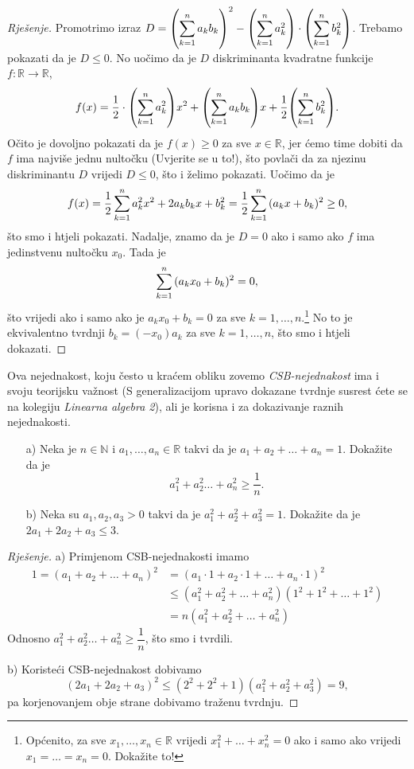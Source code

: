 \begin{proof}[Rješenje]
Promotrimo izraz $D=\left(\dsum_{k=1}^n{\,a_kb_k}\right)^2- \left(\dsum_{k=1}^n{\,a_k^2}\right)\cdot\left(\dsum_{k=1}^n{\,b_k^2}\right)$. Trebamo pokazati da je $D\leq 0$. No uočimo da je $D$ diskriminanta kvadratne funkcije $f : \mathbb{R}\to \mathbb{R}$,
$$f(x)=\dfrac{1}{2}\cdot\left(\dsum_{k=1}^n{\,a_k^2}\right)x^2+\left(\dsum_{k=1}^n{\,a_kb_k}\right)x+\dfrac{1}{2}\left(\dsum_{k=1}^n{\,b_k^2}\right).$$
Očito je dovoljno pokazati da je $f(x)\geq 0$ za sve $x\in \mathbb{R}$, jer ćemo time dobiti da $f$ ima najviše jednu nultočku (Uvjerite se u to!), što povlači da za njezinu diskriminantu $D$ vrijedi $D\leq 0$, što i želimo pokazati. Uočimo da je
$$f(x)=\dfrac{1}{2}\,\dsum_{k=1}^n{\,a_k^2x^2+2a_kb_kx+b_k^2}=\dfrac{1}{2}\,\dsum_{k=1}^n{\,(a_kx+b_k)^2}\geq 0,$$
što smo i htjeli pokazati. Nadalje, znamo da je $D=0$ ako i samo ako $f$ ima jedinstvenu nultočku $x_0$. Tada je $$\dsum_{k=1}^n{\,(a_kx_0+b_k)^2}=0,$$ što vrijedi ako i samo ako je $a_kx_0+b_k=0$ za sve $k=1, \dots, n$.\footnote{Općenito, za sve $x_1, \dots, x_n\in \mathbb{R}$ vrijedi $x_1^2+\dots+x_n^2=0$ ako i samo ako vrijedi $x_1=\dots=x_n=0$. Dokažite to!} No to je ekvivalentno tvrdnji $b_k=(-x_0)a_k$ za sve $k=1, \dots, n$, što smo i htjeli dokazati.
\end{proof}
Ova nejednakost, koju često u kraćem obliku zovemo \textit{CSB-nejednakost} ima i svoju teorijsku važnost (S generalizacijom upravo dokazane tvrdnje susrest ćete se na kolegiju \textit{Linearna algebra 2}), ali je korisna i za dokazivanje raznih nejednakosti.
\begin{exercise} \textbf{}
\begin{itemize}
\item[a)] Neka je $n\in \mathbb{N}$ i $a_1, \dots, a_n\in \mathbb{R}$ takvi da je $a_1+a_2+\dots+ a_n=1$. Dokažite da je $$a_1^2+a_2^2\dots+a_n^2\geq \dfrac{1}{n}.$$
\item[b)] Neka su $a_1, a_2, a_3>0$ takvi da je $a_1^2+a_2^2+a_3^2=1$. Dokažite da je $2a_1+2a_2+a_3\leq 3$.
\end{itemize}
\end{exercise}
\begin{proof}[Rješenje]
a) Primjenom CSB-nejednakosti imamo
\begin{align*}
1=(a_1+a_2+\dots+a_n)^2&=(a_1\cdot1+a_2\cdot 1+\dots+a_n\cdot 1)^2\\
&\leq(a_1^2+a_2^2+\dots+a_n^2)(1^2+1^2+\dots+1^2)\\
&=n(a_1^2+a_2^2+\dots+a_n^2)
\end{align*}
Odnosno $a_1^2+a_2^2\dots+a_n^2\geq \dfrac{1}{n}$, što smo i tvrdili.

b) Koristeći CSB-nejednakost dobivamo
$$(2a_1+2a_2+a_3)^2\leq (2^2+2^2+1)(a_1^2+a_2^2+a_3^2)=9,$$
pa korjenovanjem obje strane dobivamo traženu tvrdnju.
\end{proof}
